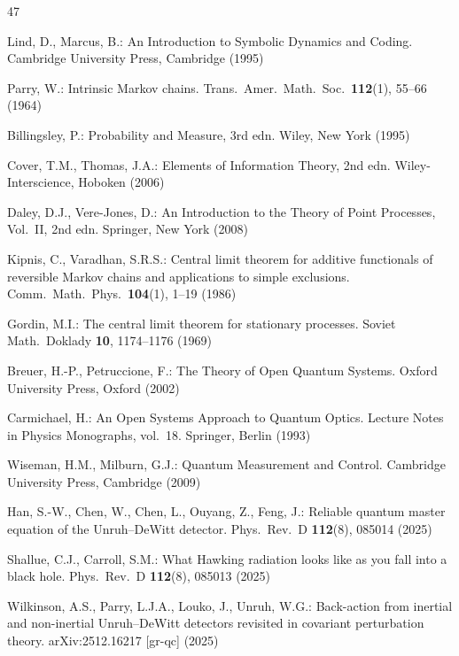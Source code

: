 \begin{thebibliography}{47}

Lind, D., Marcus, B.:
An Introduction to Symbolic Dynamics and Coding.
Cambridge University Press, Cambridge (1995)

Parry, W.:
Intrinsic Markov chains.
Trans.\ Amer.\ Math.\ Soc.\ \textbf{112}(1), 55--66 (1964)


Billingsley, P.:
Probability and Measure, 3rd edn.
Wiley, New York (1995)

Cover, T.M., Thomas, J.A.:
Elements of Information Theory, 2nd edn.
Wiley-Interscience, Hoboken (2006)

Daley, D.J., Vere-Jones, D.:
An Introduction to the Theory of Point Processes, Vol.~II, 2nd edn.
Springer, New York (2008)

Kipnis, C., Varadhan, S.R.S.:
Central limit theorem for additive functionals of reversible Markov chains and applications to simple exclusions.
Comm.\ Math.\ Phys.\ \textbf{104}(1), 1--19 (1986)

Gordin, M.I.:
The central limit theorem for stationary processes.
Soviet Math.\ Doklady \textbf{10}, 1174--1176 (1969)


Breuer, H.-P., Petruccione, F.:
The Theory of Open Quantum Systems.
Oxford University Press, Oxford (2002)

Carmichael, H.:
An Open Systems Approach to Quantum Optics.
Lecture Notes in Physics Monographs, vol.~18.
Springer, Berlin (1993)

Wiseman, H.M., Milburn, G.J.:
Quantum Measurement and Control.
Cambridge University Press, Cambridge (2009)

Han, S.-W., Chen, W., Chen, L., Ouyang, Z., Feng, J.:
Reliable quantum master equation of the Unruh--DeWitt detector.
Phys.\ Rev.\ D \textbf{112}(8), 085014 (2025)

Shallue, C.J., Carroll, S.M.:
What Hawking radiation looks like as you fall into a black hole.
Phys.\ Rev.\ D \textbf{112}(8), 085013 (2025)

Wilkinson, A.S., Parry, L.J.A., Louko, J., Unruh, W.G.:
Back-action from inertial and non-inertial Unruh--DeWitt detectors revisited in covariant perturbation theory.
arXiv:2512.16217 [gr-qc] (2025)

\end{thebibliography}
